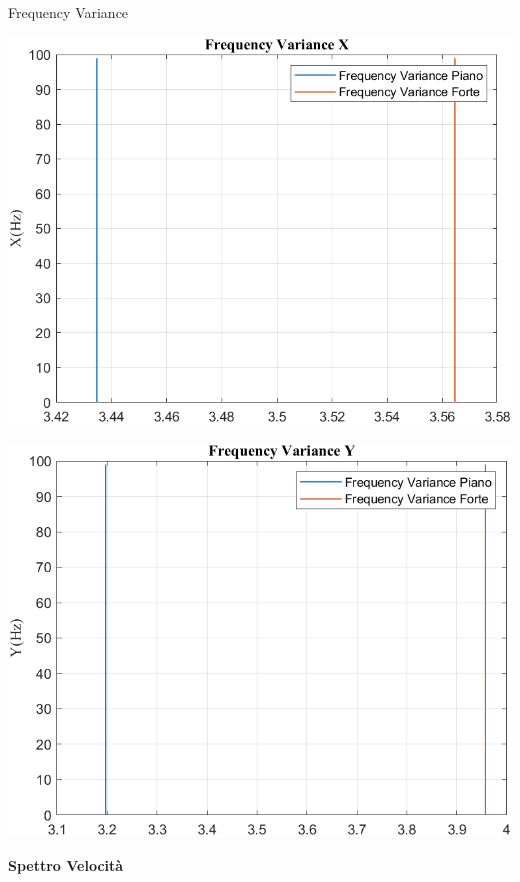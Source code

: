 	\begin{frame}{{Frequency Variance}}
		\begin{minipage}{.45\textwidth}
			\centering\includegraphics[width=.9\textwidth]{figure/Vel/Trasformata/Frequency VarianceX}
		\end{minipage}
		\hspace{.05\textwidth}
		\begin{minipage}{.45\textwidth}
			\centering\includegraphics[width=.9\textwidth]{figure/Vel/Trasformata/Frequency VarianceY}
		\end{minipage}
	\end{frame}
	
	\begin{frame}
		\color{blue}\centering\huge{\textbf{Spettro Velocità}}
	\end{frame}
	
